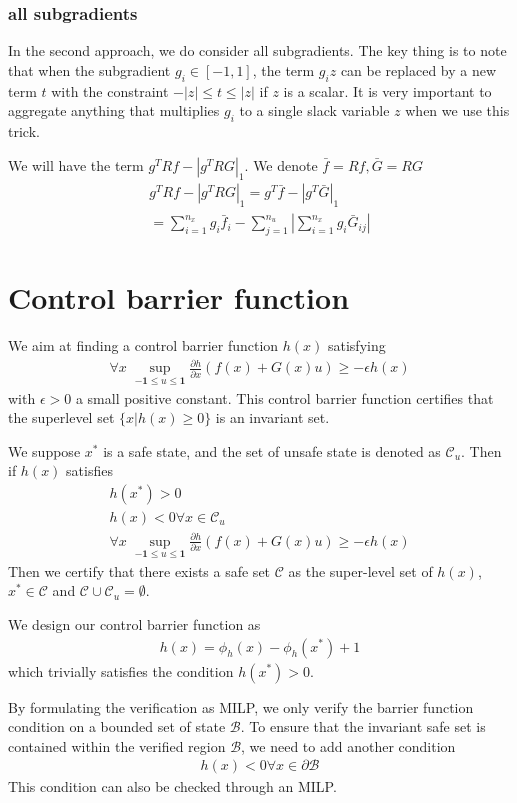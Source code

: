 \documentclass{article}
\begin{document}
\subsubsection{all subgradients}
In the second approach, we do consider all subgradients. The key thing is to note that when the subgradient $g_i \in [-1, 1]$,  the term $g_i z$ can be replaced by a new term $t$ with the constraint $-|z| \le t \le |z|$ if $z$ is a scalar. It is very important to aggregate anything that multiplies $g_i$ to a single slack variable $z$ when we use this trick.

We will have the term $g^TRf - |g^TRG|_1$. We denote $\bar{f}=Rf, \bar{G}=RG$
\begin{align}
	g^TRf - |g^TRG|_1 = g^T\bar{f} - |g^T\bar{G}|_1\\
	= \sum_{i=1}^{n_x} g_i \bar{f}_i - \sum_{j=1}^{n_u}|\sum_{i=1}^{n_x}g_i \bar{G}_{ij}|
\end{align}

\section{Control barrier function}
We aim at finding a control barrier function $h(x)$ satisfying
\begin{align}
	\forall x\;\sup_{-\mathbf{1}\le u\le\mathbf{1}} \frac{\partial h}{\partial x}(f(x) + G(x)u) \ge -\epsilon h(x)
\end{align}
with $\epsilon > 0$ a small positive constant. This control barrier function certifies that the superlevel set $\{x | h(x) \ge 0\}$ is an invariant set.

We suppose $x^*$ is a safe state, and the set of unsafe state is denoted as $\mathcal{C}_u$. Then if $h(x)$ satisfies
\begin{subequations}
\begin{align}
	h(x^*) > 0\\
	h(x) < 0 \forall x\in\mathcal{C}_u\\
	\forall x\;\sup_{-\mathbf{1}\le u\le\mathbf{1}} \frac{\partial h}{\partial x}(f(x) + G(x)u) \ge -\epsilon h(x)
\end{align}
\end{subequations}
Then we certify that there exists a safe set $\mathcal{C}$ as the super-level set of $h(x)$, $x^*\in\mathcal{C}$ and $\mathcal{C} \cup \mathcal{C}_u=\emptyset$.

We design our control barrier function as
\begin{align}
	h(x) = \phi_h(x) - \phi_h(x^*) + 1
\end{align}
which trivially satisfies the condition $h(x^*) > 0$.

By formulating the verification as MILP, we only verify the barrier function condition on a bounded set of state $\mathcal{B}$. To ensure that the invariant safe set is contained within the verified region $\mathcal{B}$, we need to add another condition
\begin{align}
	h(x) < 0 \forall x \in \partial\mathcal{B}
\end{align}
This condition can also be checked through an MILP.
\end{document}
